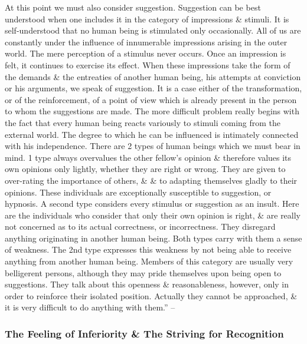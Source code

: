 \documentclass{article}
\begin{document}
At this point we must also consider suggestion. Suggestion can be best understood when one includes it in the category of impressions \& stimuli. It is self-understood that no human being is stimulated only occasionally. All of us are constantly under the influence of innumerable impressions arising in the outer world. The mere perception of a stimulus never occurs. Once an impression is felt, it continues to exercise its effect. When these impressions take the form of the demands \& the entreaties of another human being, his attempts at conviction or his arguments, we speak of suggestion. It is a case either of the transformation, or of the reinforcement, of a point of view which is already present in the person to whom the suggestions are made. The more difficult problem really begins with the fact that every human being reacts variously to stimuli coming from the external world. The degree to which he can be influenced is intimately connected with his independence. There are 2 types of human beings which we must bear in mind. 1 type always overvalues the other fellow's opinion \& therefore values its own opinions only lightly, whether they are right or wrong. They are given to over-rating the importance of others, \& \& to adapting themselves gladly to their opinions. These individuals are exceptionally susceptible to suggestion, or hypnosis. A second type considers every stimulus or suggestion as an insult. Here are the individuals who consider that only their own opinion is right, \& are really not concerned as to its actual correctness, or incorrectness. They disregard anything originating in another human being. Both types carry with them a sense of weakness. The 2nd type expresses this weakness by not being able to receive anything from another human being. Members of this category are usually very belligerent persons, although they may pride themselves upon being open to suggestions. They talk about this openness \& reasonableness, however, only in order to reinforce their isolated position. Actually they cannot be approached, \& it is very difficult to do anything with them.'' -- \cite[pp. 62--68]{Adler_human_nature}

\subsubsection{The Feeling of Inferiority \& The Striving for Recognition}
\end{document}
